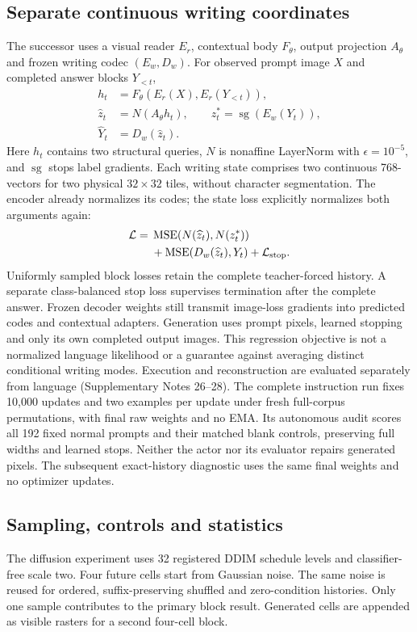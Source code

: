 \subsection*{Separate continuous writing coordinates}
The successor uses a visual reader $E_r$, contextual body $F_\theta$, output
projection $A_\theta$ and frozen writing codec $(E_w,D_w)$. For observed prompt
image $X$ and completed answer blocks $Y_{<t}$,
\begin{align}
 h_t &= F_\theta(E_r(X),E_r(Y_{<t})),\\
 \widehat z_t &= N(A_\theta h_t),\qquad z_t^*=\operatorname{sg}(E_w(Y_t)),\\
 \widehat Y_t &= D_w(\widehat z_t).
\end{align}
Here $h_t$ contains two structural queries, $N$ is nonaffine LayerNorm with
$\epsilon=10^{-5}$, and $\operatorname{sg}$ stops label gradients. Each writing
state comprises two continuous 768-vectors for two physical $32\times32$
tiles, without character segmentation. The encoder already normalizes its
codes; the state loss explicitly normalizes both arguments again:
\begin{equation}
 \begin{aligned}
 \mathcal L={}&\operatorname{MSE}(N(\widehat z_t),N(z_t^*))\\
 &+\operatorname{MSE}(D_w(\widehat z_t),Y_t)+\mathcal L_{\rm stop}.
 \end{aligned}
\end{equation}
Uniformly sampled block losses retain the complete teacher-forced history.
A separate class-balanced stop loss supervises termination after the complete
answer. Frozen decoder weights still transmit image-loss gradients into
predicted codes and contextual adapters. Generation uses prompt pixels,
learned stopping and only its own completed output images. This regression
objective is not a normalized language likelihood or a guarantee against
averaging distinct conditional writing modes. Execution and reconstruction
are evaluated separately from language (Supplementary Notes 26--28).
The complete instruction run fixes 10,000 updates and two examples per update
under fresh full-corpus permutations, with final raw weights and no EMA.
Its autonomous audit scores all 192 fixed normal prompts and their matched
blank controls, preserving full widths and learned stops. Neither the actor
nor its evaluator repairs generated pixels. The subsequent exact-history
diagnostic uses the same final weights and no optimizer updates.

\subsection*{Sampling, controls and statistics}
The diffusion experiment uses 32 registered DDIM schedule levels and classifier-free scale
two. Four future cells start from Gaussian noise. The same noise is reused for
ordered, suffix-preserving shuffled and zero-condition histories. Only one
sample contributes to the primary block result. Generated cells are appended
as visible rasters for a second four-cell block.


